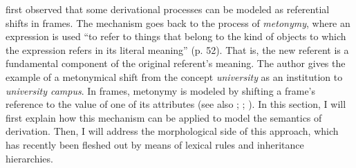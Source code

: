\citet{Loebner.2013} first observed that some derivational processes can be modeled as referential shifts in frames. The mechanism goes back to the process of \textit{metonymy}, where an expression is used ``to refer to things that belong to the kind of objects to which the expression refers in its literal meaning'' (p. 52).
That is, the new referent is a fundamental component of the original referent's meaning. The author gives the example of a metonymical shift from the concept \textit{university} as an institution to \textit{university campus}. In frames, metonymy is modeled by shifting a frame's reference to the value of one of its attributes (see also \citealt{Schulzek.2014}; \citealt[163--165]{Terhalle.2017}; \citealt[215]{Schulzek.forthcoming}).
In this section, I will first explain how this mechanism can be applied to model the semantics of derivation. Then, I will address the morphological side of this approach, which has recently been fleshed out by means of lexical rules and inheritance hierarchies.  

